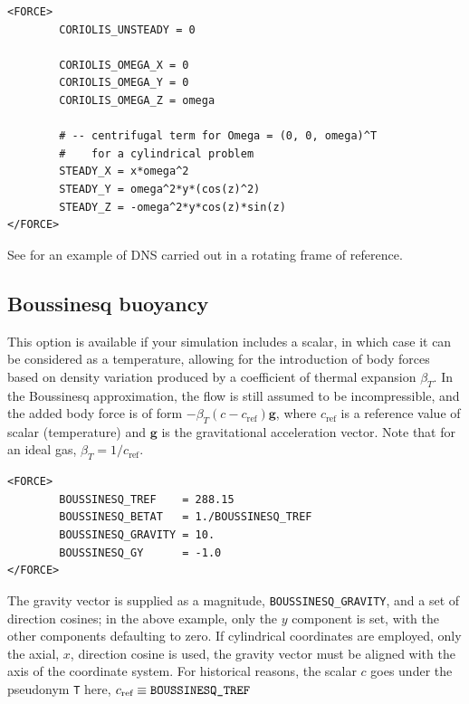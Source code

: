 \documentclass[11pt]{report}
\begin{document}
\begin{verbatim}
<FORCE>
        CORIOLIS_UNSTEADY = 0

        CORIOLIS_OMEGA_X = 0
        CORIOLIS_OMEGA_Y = 0
        CORIOLIS_OMEGA_Z = omega

        # -- centrifugal term for Omega = (0, 0, omega)^T
        #    for a cylindrical problem
        STEADY_X = x*omega^2
        STEADY_Y = omega^2*y*(cos(z)^2)
        STEADY_Z = -omega^2*y*cos(z)*sin(z)
</FORCE>
\end{verbatim}


See \citet{ablmm15} for an example of DNS carried out in a rotating
frame of reference.

\subsection{Boussinesq buoyancy}
\label{sec.bous}

This option is available if your simulation includes a scalar, in
which case it can be considered as a temperature, allowing for the
introduction of body forces based on density variation produced by a
coefficient of thermal expansion $\beta_T$.  In the Boussinesq
approximation, the flow is still assumed to be incompressible, and the
added body force is of form $-\beta_T(c-c_\textrm{ref})\bm{g}$, where
$c_\textrm{ref}$ is a reference value of scalar (\ie temperature) and
$\bm{g}$ is the gravitational acceleration vector.  Note that for an
ideal gas, $\beta_T=1/c_\textrm{ref}$.

\begin{verbatim}
<FORCE>
        BOUSSINESQ_TREF    = 288.15
        BOUSSINESQ_BETAT   = 1./BOUSSINESQ_TREF
        BOUSSINESQ_GRAVITY = 10.
        BOUSSINESQ_GY      = -1.0
</FORCE>
\end{verbatim}

The gravity vector is supplied as a magnitude,
\verb|BOUSSINESQ_GRAVITY|, and a set of direction cosines; in the
above example, only the $y$ component is set, with the other
components defaulting to zero.  If cylindrical coordinates are
employed, only the axial, $x$, direction cosine is used, \ie the
gravity vector must be aligned with the axis of the coordinate system.
For historical reasons, the scalar $c$ goes under the pseudonym
\verb|T| here, \ie $c_\textrm{ref}\equiv\verb|BOUSSINESQ_TREF|$
\end{document}
